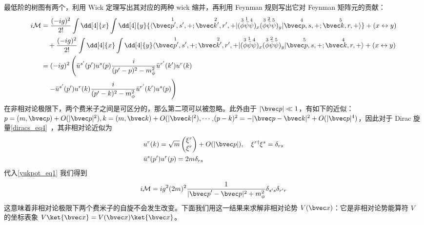 最低阶的树图有两个，利用 Wick 定理写出其对应的两种 wick 缩并，再利用 Feynman 规则写出它对 Feynman 矩阵元的贡献：
\begin{equation}\label{yukpot_eq1}
\begin{aligned}
\notag i\mathcal{M}&=
\frac{(-ig)^2}{2!}\int \dd[4]{x} \int  \dd[4]{y} 
{
\langle\overset{1}{\bvec p',s',+};\overset{2}{\bvec k',r',+}|
(\overset{3}\phi  \overset{1}{\bar{\psi}} \overset{4}\psi)_x 
(\overset{3}\phi \overset{2}{\bar{\psi}} \overset{5}\psi)_y
|\overset{4}{\bvec p,s,+};\overset{5}{\bvec k,r,+} \rangle
}+(x\leftrightarrow y)\\
&\quad +
\frac{(-ig)^2}{2!}\int \dd[4]{x} \int  \dd[4]{y} 
\langle\overset{1}{\bvec p',s',+};\overset{2}{\bvec k',r',+}|
(\overset{3}\phi  \overset{1}{\bar{\psi}} \overset{4}\psi)_x 
(\overset{3}\phi \overset{2}{\bar{\psi}} \overset{5}\psi)_y
|\overset{5}{\bvec p,s,+};\overset{4}{\bvec k,r,+} \rangle
+(x\leftrightarrow y)\\
&=(-ig)^2\left(
 \bar u^{s'}(p')u^s(p) \frac{i}{(p'-p)^2-m_{\phi}^2} \bar u^{r'}(k') u^r(k)
\right.\\
&\left.\quad 
-\bar u^{s'}(p')u^r(k) \frac{i}{(p'-k)^2-m_{\phi}^2} \bar u^{r'}(k') u^{s}(p)  \right)
\end{aligned}
\end{equation}
在非相对论极限下，两个费米子之间是可区分的，那么第二项可以被忽略。此外由于 $|\bvec p|\ll 1$，有如下的近似：$p=(m,{\bvec p})+O(|{\bvec p}|^2),k=(m,{\bvec k})+O(|{\bvec k}|^2),\cdots$,$(p-k)^2=-|{\bvec p}-{\bvec k}|^2+O(|{\bvec p}|^4)$，因此对于 Dirac 旋量\autoref{diracs_eq4}~，其非相对论近似为
\begin{equation}
\begin{aligned}
&u^r(k)=\sqrt{m} \begin{pmatrix}\xi^r\\ \xi^r\end{pmatrix}+O(|{\bvec p}|),\quad  \xi^{r\dagger}\xi^s=\delta_{rs}\\
&\bar u^s(p') u^r(p)=2m \delta_{rs}
\end{aligned}
\end{equation}
代入\autoref{yukpot_eq1} 我们得到
\begin{equation}\label{yukpot_eq2}
\begin{aligned}
i\mathcal{M} = i g^2 (2m)^2 \frac{1}{|{\bvec p}'-{\bvec p}|^2+m_\phi^2}\delta_{s' s}\delta_{r' r}
\end{aligned}
\end{equation}
这意味着非相对论极限下两个费米子的自旋不会发生改变。下面我们用这一结果来求解非相对论势 $V(\bvec x)$：它是非相对论势能算符 $V$ 的坐标表象 $V\ket{\bvec x}=V(\bvec x)\ket{\bvec x}$。

